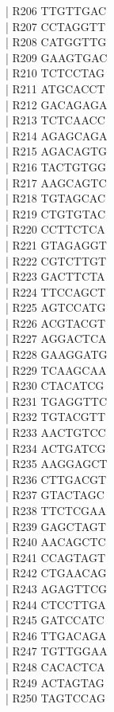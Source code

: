 \documentclass[titlepage,10pt,a4paper,uplatex]{jsbook}
\newenvironment{content}{\begin{shaded}\vspace{-1em}\raggedright\ttfamily\footnotesize\setlength{\baselineskip}{1.4em}}{\end{shaded}\vspace{-1em}}
\begin{document}
\begin{content}
| R206	TTGTTGAC\\
| R207	CCTAGGTT\\
| R208	CATGGTTG\\
| R209	GAAGTGAC\\
| R210	TCTCCTAG\\
| R211	ATGCACCT\\
| R212	GACAGAGA\\
| R213	TCTCAACC\\
| R214	AGAGCAGA\\
| R215	AGACAGTG\\
| R216	TACTGTGG\\
| R217	AAGCAGTC\\
| R218	TGTAGCAC\\
| R219	CTGTGTAC\\
| R220	CCTTCTCA\\
| R221	GTAGAGGT\\
| R222	CGTCTTGT\\
| R223	GACTTCTA\\
| R224	TTCCAGCT\\
| R225	AGTCCATG\\
| R226	ACGTACGT\\
| R227	AGGACTCA\\
| R228	GAAGGATG\\
| R229	TCAAGCAA\\
| R230	CTACATCG\\
| R231	TGAGGTTC\\
| R232	TGTACGTT\\
| R233	AACTGTCC\\
| R234	ACTGATCG\\
| R235	AAGGAGCT\\
| R236	CTTGACGT\\
| R237	GTACTAGC\\
| R238	TTCTCGAA\\
| R239	GAGCTAGT\\
| R240	AACAGCTC\\
| R241	CCAGTAGT\\
| R242	CTGAACAG\\
| R243	AGAGTTCG\\
| R244	CTCCTTGA\\
| R245	GATCCATC\\
| R246	TTGACAGA\\
| R247	TGTTGGAA\\
| R248	CACACTCA\\
| R249	ACTAGTAG\\
| R250	TAGTCCAG\\

\end{content}
\end{document}
